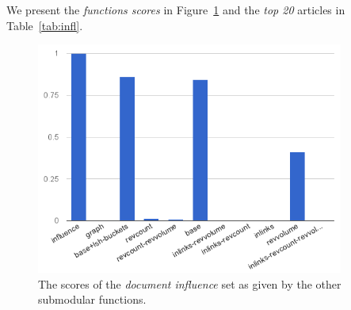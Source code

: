 We present the \emph{functions scores} in Figure~\ref{img:infl} and the
\emph{top 20} articles in Table~\ref{tab:infl}.

\begin{figure}
  \centering
  \includegraphics[width=0.9\textwidth,natwidth=555,natheight=419]{images/infl.png}
  \caption{The scores of the \emph{document influence} set as given by the
  other submodular functions.}
  \label{img:infl}
\end{figure}

